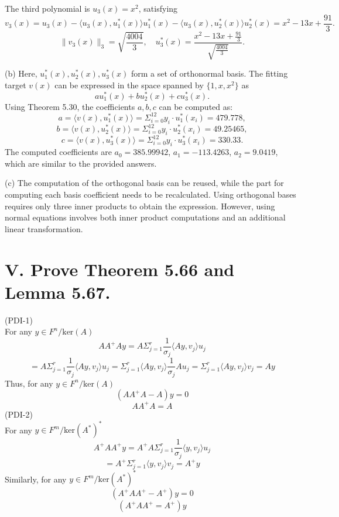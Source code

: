 \documentclass[a4paper]{article}
\begin{document}
The third polynomial is \(u_3(x) = x^2\), satisfying  
\[
v_3(x) = u_3(x) - \langle u_3(x), u_1^*(x) \rangle u_1^*(x) - \langle u_3(x), u_2^*(x) \rangle u_2^*(x) = x^2 - 13x + \frac{91}{3}.
\]  
\[
\|v_3(x)\|_3 = \sqrt{\frac{4004}{3}}, \quad u_3^*(x) = \frac{x^2 - 13x + \frac{91}{3}}{\sqrt{\frac{4004}{3}}}.
\]  

(b)  
Here, \(u_1^*(x), u_2^*(x), u_3^*(x)\) form a set of orthonormal basis.  
The fitting target \(v(x)\) can be expressed in the space spanned by \(\{1, x, x^2\}\) as  
\[
a u_1^*(x) + b u_2^*(x) + c u_3^*(x).
\]  
Using Theorem 5.30, the coefficients \(a, b, c\) can be computed as:  
\[
a = \langle v(x), u_1^*(x) \rangle = \Sigma_{i=0}^{12} y_i \cdot u_1^*(x_i) = 479.778,
\]  
\[
b = \langle v(x), u_2^*(x) \rangle = \Sigma_{i=0}^{12} y_i \cdot u_2^*(x_i) = 49.25465,
\]  
\[
c = \langle v(x), u_3^*(x) \rangle = \Sigma_{i=0}^{12} y_i \cdot u_3^*(x_i) = 330.33.
\]  
The computed coefficients are \(a_0 = 385.99942\), \(a_1 = -113.4263\), \(a_2 = 9.0419\), which are similar to the provided answers.

(c)  
The computation of the orthogonal basis can be reused, while the part for computing each basis coefficient needs to be recalculated.  
Using orthogonal bases requires only three inner products to obtain the expression.  
However, using normal equations involves both inner product computations and an additional linear transformation.

\section*{V. Prove Theorem 5.66 and Lemma 5.67.}
(PDI-1)\\
For any \( y \in F^n / \text{ker}(A) \)\
\[ AA^+A y = A \Sigma_{j=1}^r \frac{1}{\sigma_j} \langle Ay, v_j \rangle u_j \]
\[ = A \Sigma_{j=1}^r \frac{1}{\sigma_j} \langle Ay, v_j \rangle u_j = \Sigma_{j=1}^r \langle Ay, v_j \rangle \frac{1}{\sigma_j} Au_j = \Sigma_{j=1}^r \langle Ay, v_j \rangle v_j = Ay \]
Thus, for any \( y \in F^n / \text{ker}(A) \)\
\[ (AA^+A - A)y = 0 \]
\[ AA^+A = A \]
(PDI-2)\\
For any \( y \in F^m / \text{ker}(A^*)^* \)\
\[ A^+AA^+ y = A^+ A \Sigma_{j=1}^r \frac{1}{\sigma_j} \langle y, v_j \rangle u_j \]
\[ = A^+ \Sigma_{j=1}^r \langle y, v_j \rangle v_j = A^+ y \]
Similarly, for any \( y \in F^m / \text{ker}(A^*)^* \)\
\[ (A^+AA^+ - A^+)y = 0 \]
\[ (A^+AA^+ = A^+)y \]
\end{document}

